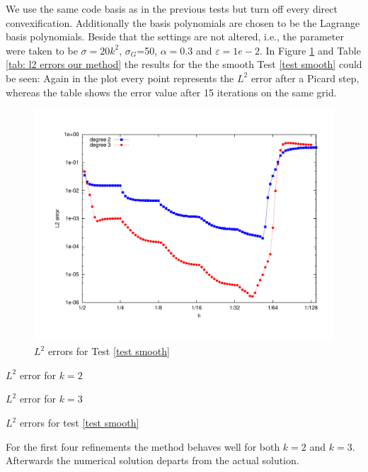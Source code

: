 We use the same code basis as in the previous tests but turn off every direct convexification. Additionally the basis polynomials are chosen to be the Lagrange basis polynomials. Beside that the settings are not altered, i.e., the parameter were taken to be $\sigma = 20 k^2$, $\sigma_G$=50, $\alpha=0.3$ and $\varepsilon = 1e-2$. 
In Figure \ref{fig: l2 errors test smooth ourMethod} and Table \ref{tab: l2 errors our method} the results for the the smooth Test \ref{test smooth}  could be seen: Again in the plot every point represents the $L^2$ error after a Picard step, whereas the table shows the error value after 15 iterations on the same grid.
\begin{figure}[H]
	\centering
	\includegraphics[scale =0.4]{plots/MA1.pdf}
	\caption{$L^2$ errors for Test \ref{test smooth}}
	\label{fig: l2 errors test smooth ourMethod}
\end{figure}
\begin{table}[H]
	\centering
	\begin{subtable}[b]{0.45\textwidth}
		\centering
		\caption{$L^2$ error for $k=2$}
	\end{subtable}
	\begin{subtable}[b]{0.45\textwidth}
		\centering
		\caption{$L^2$ error for $k=3$}
	\end{subtable}
	\caption{$L^2$ errors for test \ref{test smooth}}
	\label{tab: l2 errors our method}
\end{table}
 For the first four refinements the method behaves well for both $k=2$ and $k=3$. Afterwards the numerical solution departs from the actual solution.
 
